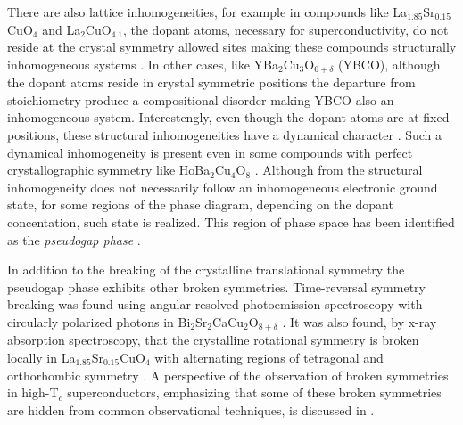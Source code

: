 There are also lattice inhomogeneities, for example in compounds like La$_{1.85}$Sr$_{0.15}$CuO$_{4}$ and La$_{2}$CuO$_{4.1}$, the dopant atoms, necessary for superconductivity, do not reside at the crystal symmetry allowed sites making these compounds structurally inhomogeneous systems \cite{Poccia2011}.
In other cases, like YBa$_2$Cu$_3$O$_{6+\delta}$ (YBCO), although the dopant atoms reside in crystal symmetric positions the departure from stoichiometry produce a compositional disorder \cite{Chen1988,Andersen1990} making YBCO also an inhomogeneous system.
Interestengly, even though the dopant atoms are at fixed positions, these structural inhomogeneities have a dynamical character \cite{Mihailovic2005,Bianconi1996}.
Such a dynamical inhomogeneity is present even in some compounds with perfect crystallographic symmetry like HoBa$_{2}$Cu$_{4}$O$_{8}$ \cite{RubioTemprano2000}.
Although from the structural inhomogeneity does not necessarily follow an inhomogeneous electronic ground state, for some regions of the phase diagram, depending on the dopant concentation, such state is realized.
This region of phase space has been identified as the \textit{pseudogap phase} \cite{Kresin2009,Muller2007,Timusk1999}.

In addition to the breaking of the crystalline translational symmetry the pseudogap phase exhibits other broken symmetries. 
Time-reversal symmetry breaking was found using angular resolved photoemission spectroscopy with circularly polarized photons in Bi$_{2}$Sr$_{2}$CaCu$_{2}$O$_{8+\delta}$ \cite{Kaminski2002}.
It was also found, by x-ray absorption spectroscopy, that the crystalline rotational symmetry is broken locally in La$_{1.85}$Sr$_{0.15}$CuO$_{4}$ with alternating regions of tetragonal and orthorhombic symmetry \cite{Bianconi1996}.
A perspective of the observation of broken symmetries in high-T$_{c}$ superconductors, emphasizing that some of these broken symmetries are hidden from common observational techniques, is discussed in \cite{Chakravarty2011}.

\cite{Chakravarty2008}

